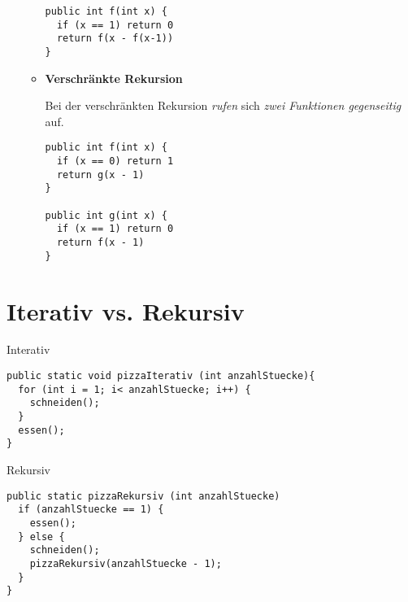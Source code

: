 \documentclass{bschlangaul-theorie}
\begin{document}
\begin{itemize}
\begin{itemize}
\begin{verbatim}
public int f(int x) {
  if (x == 1) return 0
  return f(x - f(x-1))
}
\end{verbatim}

%

\item \textbf{Verschränkte Rekursion}

Bei der verschränkten Rekursion \emph{rufen} sich \emph{zwei Funktionen
gegenseitig} auf.

\begin{verbatim}
public int f(int x) {
  if (x == 0) return 1
  return g(x - 1)
}

public int g(int x) {
  if (x == 1) return 0
  return f(x - 1)
}
\end{verbatim}
\end{itemize}
\end{itemize}

%

\section{Iterativ vs. Rekursiv}

\cite[Seite 16-19 (Gedruckte Seitenzahlen stimmen nicht)]{aud:fs:1}

Interativ

\begin{verbatim}
public static void pizzaIterativ (int anzahlStuecke){
  for (int i = 1; i< anzahlStuecke; i++) {
    schneiden();
  }
  essen();
}
\end{verbatim}

Rekursiv

\begin{verbatim}
public static pizzaRekursiv (int anzahlStuecke)
  if (anzahlStuecke == 1) {
    essen();
  } else {
    schneiden();
    pizzaRekursiv(anzahlStuecke - 1);
  }
}
\end{verbatim}

\literatur
\end{document}
